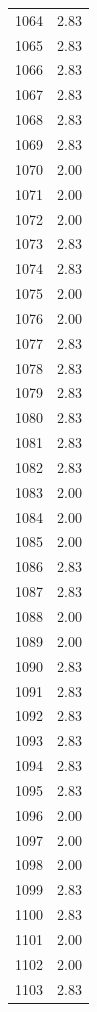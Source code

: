 \documentclass[a4paper,11pt]{article}
\begin{document}
\begin{center}
\begin{longtable}{|R{1.5cm}|R{2.5cm}|}
 1064  &         2.83 \\ 
 1065  &         2.83 \\ 
 1066  &         2.83 \\ 
 1067  &         2.83 \\ 
 1068  &         2.83 \\ 
 1069  &         2.83 \\ 
 1070  &         2.00 \\ 
 1071  &         2.00 \\ 
 1072  &         2.00 \\ 
 1073  &         2.83 \\ 
 1074  &         2.83 \\ 
 1075  &         2.00 \\ 
 1076  &         2.00 \\ 
 1077  &         2.83 \\ 
 1078  &         2.83 \\ 
 1079  &         2.83 \\ 
 1080  &         2.83 \\ 
 1081  &         2.83 \\ 
 1082  &         2.83 \\ 
 1083  &         2.00 \\ 
 1084  &         2.00 \\ 
 1085  &         2.00 \\ 
 1086  &         2.83 \\ 
 1087  &         2.83 \\ 
 1088  &         2.00 \\ 
 1089  &         2.00 \\ 
 1090  &         2.83 \\ 
 1091  &         2.83 \\ 
 1092  &         2.83 \\ 
 1093  &         2.83 \\ 
 1094  &         2.83 \\ 
 1095  &         2.83 \\ 
 1096  &         2.00 \\ 
 1097  &         2.00 \\ 
 1098  &         2.00 \\ 
 1099  &         2.83 \\ 
 1100  &         2.83 \\ 
 1101  &         2.00 \\ 
 1102  &         2.00 \\ 
 1103  &         2.83 \\ 

\end{longtable}
\end{center}
\end{document}

